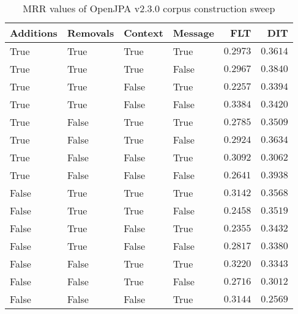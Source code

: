 
\begin{table}
\begin{spacing}{1.2}
\centering
\caption{MRR values of OpenJPA v2.3.0 corpus construction sweep}
\label{table:openjpa_corpus_sweep}
\vspace{0.2em}
\begin{tabular}{llll|rr}
\toprule
Additions & Removals & Context & Message & FLT &        DIT \\
\midrule
     True &     True &    True &    True &         $0.2973$ &      $0.3614$ \\
     True &     True &    True &   False &         $0.2967$ &      $0.3840$ \\
     True &     True &   False &    True &         $0.2257$ &      $0.3394$ \\
     True &     True &   False &   False &    $\bm{0.3384}$ &      $0.3420$ \\
     True &    False &    True &    True &         $0.2785$ &      $0.3509$ \\
     True &    False &    True &   False &         $0.2924$ &      $0.3634$ \\
     True &    False &   False &    True &         $0.3092$ &      $0.3062$ \\
     True &    False &   False &   False &         $0.2641$ & $\bm{0.3938}$ \\
    False &     True &    True &    True &         $0.3142$ &      $0.3568$ \\
    False &     True &    True &   False &         $0.2458$ &      $0.3519$ \\
    False &     True &   False &    True &         $0.2355$ &      $0.3432$ \\
    False &     True &   False &   False &         $0.2817$ &      $0.3380$ \\
    False &    False &    True &    True &         $0.3220$ &      $0.3343$ \\
    False &    False &    True &   False &         $0.2716$ &      $0.3012$ \\
    False &    False &   False &    True &         $0.3144$ &      $0.2569$ \\
\bottomrule
\end{tabular}

\end{spacing}
\end{table}
